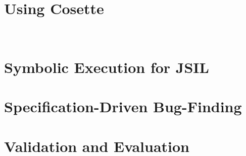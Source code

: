 \documentclass[sigconf, review]{acmart}
\newcommand{\jsil}{JSIL\xspace}
\newcommand{\polish}[1]{{\color{red}#1}}
\newcommand{\cosette}{Cosette\xspace}
\newcommand{\myparagraph}[1]{\smallskip\noindent {\bf #1.}\hspace{1pt}}
\begin{document}
%
%
%
%




\section{Using \cosette}\label{sec:overview}


\newpage \ \newpage
\section{Symbolic Execution for \jsil}\label{sec:jsil:symb:exec}


\newpage
\section{Specification-Driven Bug-Finding}\label{sec:specs}


%

\newpage
\section{Validation and Evaluation}\label{sec:evaluation}

\end{document}
